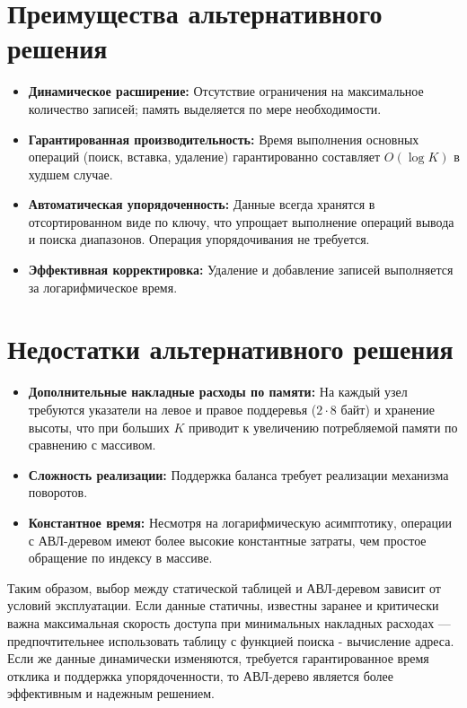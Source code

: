 \documentclass{bmstu}
\begin{document}
\section*{Преимущества альтернативного решения}
\begin{itemize}
    \item \textbf{Динамическое расширение:} Отсутствие ограничения на максимальное количество записей; память выделяется по мере необходимости.
    \item \textbf{Гарантированная производительность:} Время выполнения основных операций (поиск, вставка, удаление) гарантированно составляет $O(\log K)$ в худшем случае.
    \item \textbf{Автоматическая упорядоченность:} Данные всегда хранятся в отсортированном виде по ключу, что упрощает выполнение операций вывода и поиска диапазонов. Операция упорядочивания не требуется.
    \item \textbf{Эффективная корректировка:} Удаление и добавление записей выполняется за логарифмическое время.
\end{itemize}

\section*{Недостатки альтернативного решения}
\begin{itemize}
    \item \textbf{Дополнительные накладные расходы по памяти:} На каждый узел требуются указатели на левое и правое поддеревья ($2 \cdot 8$ байт) и хранение высоты, что при больших $K$ приводит к увеличению потребляемой памяти по сравнению с массивом.
    \item \textbf{Сложность реализации:} Поддержка баланса требует реализации механизма поворотов.
    \item \textbf{Константное время:} Несмотря на логарифмическую асимптотику, операции с АВЛ-деревом имеют более высокие константные затраты, чем простое обращение по индексу в массиве.
\end{itemize}

Таким образом, выбор между статической таблицей и АВЛ-деревом зависит от условий эксплуатации.
Если данные статичны, известны заранее и критически важна максимальная скорость доступа при минимальных накладных расходах — предпочтительнее использовать таблицу с функцией поиска - вычисление адреса.
Если же данные динамически изменяются, требуется гарантированное время отклика и поддержка упорядоченности, то АВЛ-дерево является более эффективным и надежным решением.
\end{document}
